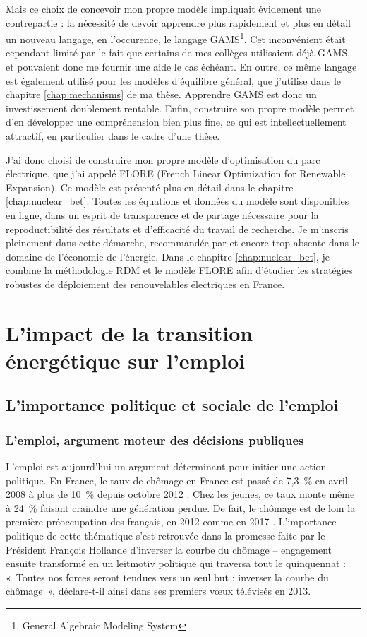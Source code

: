 Mais ce choix de concevoir mon propre modèle impliquait évidement une contrepartie : la nécessité de devoir apprendre plus rapidement et plus en détail un nouveau langage, en l'occurence, le langage GAMS\footnote{General Algebraic Modeling System}. 
Cet inconvénient était cependant limité par le fait que certains de mes collèges utilisaient déjà GAMS, et pouvaient donc me fournir une aide le cas échéant. 
En outre, ce même langage est également utilisé pour les modèles d'équilibre général, que j'utilise dans le chapitre \ref{chap:mechanisms} de ma thèse. Apprendre GAMS est donc un investissement doublement rentable. 
Enfin, construire son propre modèle permet d'en développer une compréhension bien plus fine, ce qui est intellectuellement attractif, en particulier dans le cadre d'une thèse.

J’ai donc choisi de construire mon propre modèle d’optimisation du parc électrique, que j’ai appelé FLORE (French Linear Optimization for Renewable Expansion). Ce modèle est présenté plus en détail dans le chapitre \ref{chap:nuclear_bet}.
Toutes les équations et données du modèle sont disponibles en ligne, dans un esprit de transparence et de partage nécessaire pour la reproductibilité des résultats et d’efficacité du travail de recherche. Je m’inscris pleinement dans cette démarche, recommandée par \citet{Pfenninger2017} et encore trop absente dans le domaine de l’économie de l’énergie.
Dans le chapitre \ref{chap:nuclear_bet}, je combine la méthodologie RDM et le modèle FLORE afin d’étudier les stratégies robustes de déploiement des renouvelables électriques en France.

\section{L’impact de la transition énergétique sur l’emploi}
\label{sec:intro_emploi}


\subsection{L'importance politique et sociale de l'emploi}

\subsubsection{L'emploi, argument moteur des décisions publiques}

L’emploi est aujourd'hui un argument déterminant pour initier une action politique.
En France, le taux de chômage en France est passé de 7,3~\% en avril 2008 à plus de 10~\% depuis octobre 2012 \citep{Eurostat}. Chez les jeunes, ce taux monte même à 24~\% \citep{OCDE} faisant craindre une génération perdue.
De fait, le chômage est de loin la première préoccupation des français, en 2012 \citep{TNSSOFRES2012} comme en 2017 \citep{IFOP2017}.
L'importance politique de cette thématique s'est retrouvée dans la promesse faite par le Président François Hollande d'inverser la courbe du chômage -- engagement ensuite transformé en un leitmotiv politique qui traversa tout le quinquennat : «~Toutes nos forces seront tendues vers un seul but : inverser la courbe du chômage~», déclare-t-il ainsi dans ses premiers v\oe{}ux télévisés en 2013.

